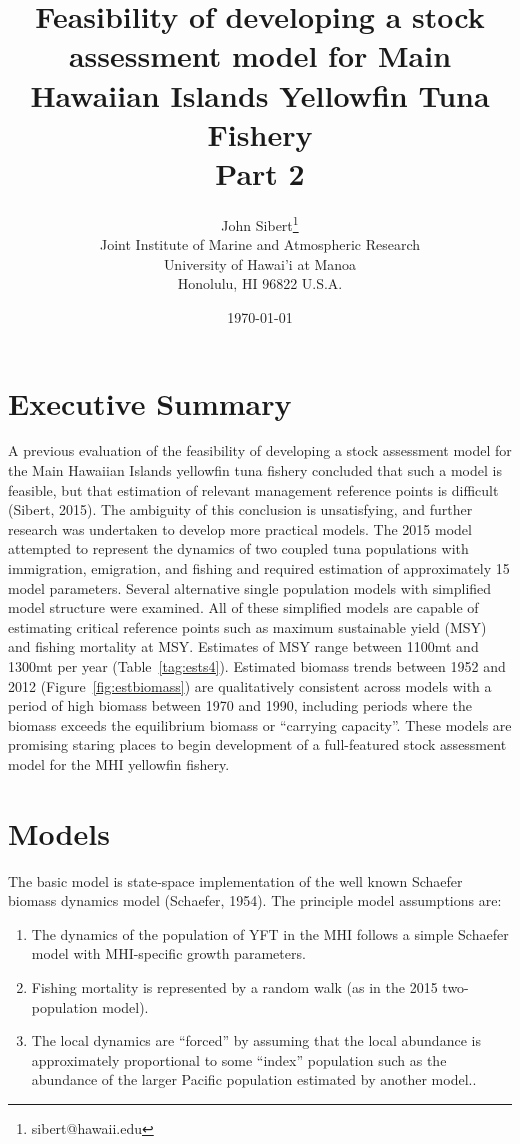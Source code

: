 \documentclass[12pt,letterpaper,twoside]{article}
\title{Feasibility of developing a stock assessment model for Main
Hawaiian Islands Yellowfin Tuna Fishery\\
\vspace{2ex}
Part 2}
\author{
John Sibert\thanks{sibert@hawaii.edu}\\
Joint Institute of Marine and Atmospheric Research\\
University of Hawai'i at Manoa\\
Honolulu, HI  96822 U.S.A.\\[0.125in]
\date{\today}
}
\newcommand\doublespacing{\baselineskip=1.6\normalbaselineskip}
\begin{document}
\maketitle



\section{Executive Summary}
A previous evaluation of the feasibility of developing a
stock assessment model for the Main Hawaiian Islands yellowfin tuna
fishery concluded that such a model is feasible, but that estimation of
relevant management reference points is difficult (Sibert, 2015).
The ambiguity of this
conclusion is unsatisfying, and further research was undertaken to
develop more practical models. The 2015 model attempted to represent
the dynamics of two coupled tuna populations with immigration,
emigration, and fishing and required estimation of approximately 15
model parameters.
Several alternative single population models with simplified model
structure
were examined. All of these simplified models are capable of
estimating critical reference points such as maximum sustainable
yield (MSY) and fishing mortality at MSY. Estimates of MSY range
between 1100mt and 1300mt per year (Table~\ref{tag:ests4}).
Estimated biomass trends between 1952 and 2012 
(Figure~\ref{fig:estbiomass}) are
qualitatively consistent across models with a period of high biomass
between 1970 and 1990, including periods where the biomass exceeds the
equilibrium biomass or ``carrying capacity''. 
These models are
promising staring places to begin development of a full-featured stock
assessment model for the MHI yellowfin fishery.

\section{Models}
The basic model is  state-space implementation of the well known
Schaefer biomass dynamics model (Schaefer, 1954).
The principle model assumptions are:
\begin{enumerate}
\item The dynamics of the population of YFT in the MHI follows a
simple Schaefer model with MHI-specific growth parameters.
\item Fishing mortality is represented by a random walk (as in the
2015 two-population model).
\item The local dynamics are ``forced'' by assuming that the local
abundance is approximately proportional to some ``index'' population
such as the abundance of the larger Pacific population estimated by
another model..
\end{enumerate}
\end{document}
